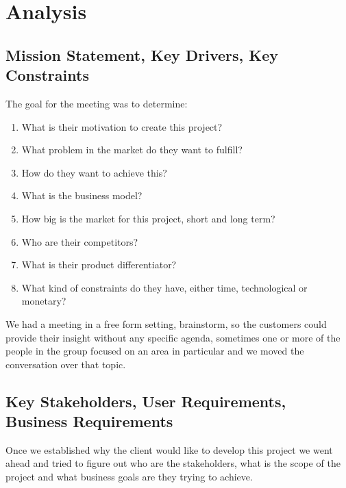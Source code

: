 \section{Analysis}
\subsection{Mission Statement, Key Drivers, Key Constraints}
The goal for the meeting was to determine:

\begin{enumerate}
    \item What is their motivation to create this project?
    \item What problem in the market do they want to fulfill?
    \item How do they want to achieve this?
    \item What is the business model?
    \item How big is the market for this project, short and long term?
    \item Who are their competitors?
    \item What is their product differentiator?
    \item What kind of constraints do they have, either time, 
    technological or monetary?
\end{enumerate}

\noindent We had a meeting in a free form setting, brainstorm, so the customers could 
provide their insight without any specific agenda, sometimes one or more of the 
people in the group focused on an area in particular and we moved the 
conversation over that topic.

\pagebreak
\subsection{Key Stakeholders, User Requirements, Business Requirements}
Once we established why the client would like to develop this project we went 
ahead and tried to figure out who are the stakeholders, what is the scope of 
the project and what business goals are they trying to achieve. \newline

